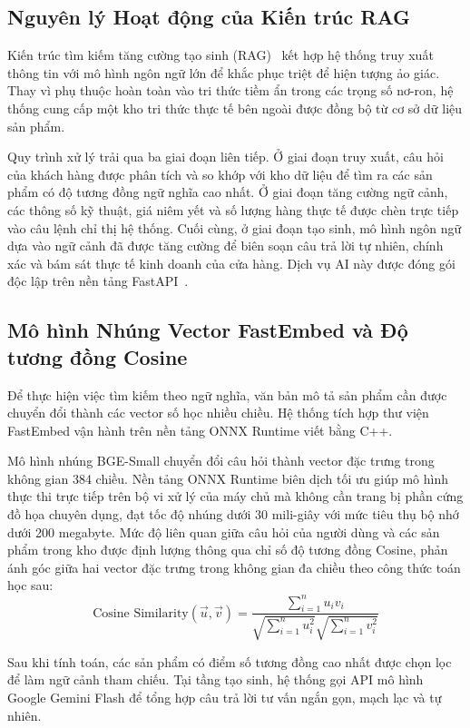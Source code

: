 \subsection{Nguyên lý Hoạt động của Kiến trúc RAG}
Kiến trúc tìm kiếm tăng cường tạo sinh (RAG)~\cite{lewis2020rag} kết hợp hệ thống truy xuất thông tin với mô hình ngôn ngữ lớn để khắc phục triệt để hiện tượng ảo giác. Thay vì phụ thuộc hoàn toàn vào tri thức tiềm ẩn trong các trọng số nơ-ron, hệ thống cung cấp một kho tri thức thực tế bên ngoài được đồng bộ từ cơ sở dữ liệu sản phẩm.

Quy trình xử lý trải qua ba giai đoạn liên tiếp. Ở giai đoạn truy xuất, câu hỏi của khách hàng được phân tích và so khớp với kho dữ liệu để tìm ra các sản phẩm có độ tương đồng ngữ nghĩa cao nhất. Ở giai đoạn tăng cường ngữ cảnh, các thông số kỹ thuật, giá niêm yết và số lượng hàng thực tế được chèn trực tiếp vào câu lệnh chỉ thị hệ thống. Cuối cùng, ở giai đoạn tạo sinh, mô hình ngôn ngữ dựa vào ngữ cảnh đã được tăng cường để biên soạn câu trả lời tự nhiên, chính xác và bám sát thực tế kinh doanh của cửa hàng. Dịch vụ AI này được đóng gói độc lập trên nền tảng FastAPI~\cite{fastapi2024docs}.

\subsection{Mô hình Nhúng Vector FastEmbed và Độ tương đồng Cosine}
Để thực hiện việc tìm kiếm theo ngữ nghĩa, văn bản mô tả sản phẩm cần được chuyển đổi thành các vector số học nhiều chiều. Hệ thống tích hợp thư viện FastEmbed vận hành trên nền tảng ONNX Runtime viết bằng C++.

Mô hình nhúng BGE-Small chuyển đổi câu hỏi thành vector đặc trưng trong không gian 384 chiều. Nền tảng ONNX Runtime biên dịch tối ưu giúp mô hình thực thi trực tiếp trên bộ vi xử lý của máy chủ mà không cần trang bị phần cứng đồ họa chuyên dụng, đạt tốc độ nhúng dưới 30 mili-giây với mức tiêu thụ bộ nhớ dưới 200 megabyte. Mức độ liên quan giữa câu hỏi của người dùng và các sản phẩm trong kho được định lượng thông qua chỉ số độ tương đồng Cosine, phản ánh góc giữa hai vector đặc trưng trong không gian đa chiều theo công thức toán học sau:
\begin{equation}
\text{Cosine Similarity}(\vec{u}, \vec{v}) = \frac{\sum_{i=1}^{n} u_i v_i}{\sqrt{\sum_{i=1}^{n} u_i^2} \sqrt{\sum_{i=1}^{n} v_i^2}}
\end{equation}

Sau khi tính toán, các sản phẩm có điểm số tương đồng cao nhất được chọn lọc để làm ngữ cảnh tham chiếu. Tại tầng tạo sinh, hệ thống gọi API mô hình Google Gemini Flash để tổng hợp câu trả lời tư vấn ngắn gọn, mạch lạc và tự nhiên.

